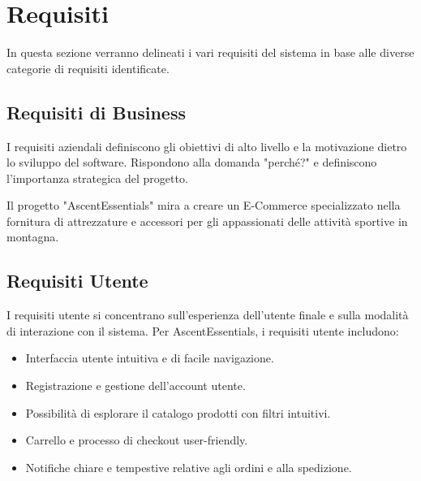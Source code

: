 
\chapter{Requisiti}

In questa sezione verranno delineati i vari requisiti del sistema in base alle diverse categorie di requisiti identificate.

\section{Requisiti di Business}
I requisiti aziendali definiscono gli obiettivi di alto livello e la motivazione dietro lo sviluppo del software. Rispondono alla domanda "perché?" e definiscono l'importanza strategica del progetto.

Il progetto "AscentEssentials" mira a creare un E-Commerce specializzato nella fornitura di attrezzature e accessori per gli appassionati delle attività sportive in montagna.

\section{Requisiti Utente}
I requisiti utente si concentrano sull'esperienza dell'utente finale e sulla modalità di interazione con il sistema. Per AscentEssentials, i requisiti utente includono:
\begin{itemize}
    \item Interfaccia utente intuitiva e di facile navigazione.
    \item Registrazione e gestione dell'account utente.
    \item Possibilità di esplorare il catalogo prodotti con filtri intuitivi.
    \item Carrello e processo di checkout user-friendly.
    \item Notifiche chiare e tempestive relative agli ordini e alla spedizione.
\end{itemize}